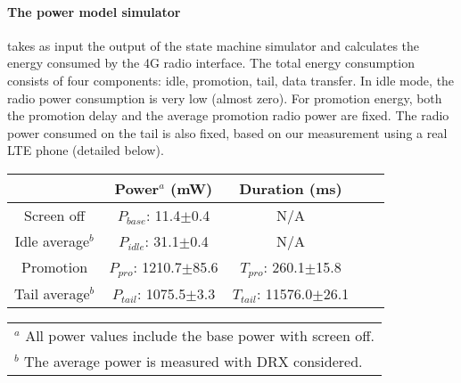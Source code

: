 \paragraph{The power model simulator} takes as input the output of the state machine simulator and calculates the energy consumed by the 4G radio interface. The total energy consumption consists of four components: idle, promotion, tail, data transfer. In idle mode, the radio power consumption is very low (almost zero). For promotion energy, both the promotion delay and the average promotion radio power are fixed. The radio power consumed on the tail is also fixed, based on our measurement using a real LTE phone (detailed below).


\begin{table}[t]
\begin{center}
\begin{tabular}{|c|c|c|c|c|}\hline
            & Power$^{a}$ (mW)        & Duration (ms) \\
\hline
Screen off       & $P_{base}$: 11.4$\pm$0.4      & N/A       \\
Idle average$^{b}$   & $P_{idle}$: 31.1$\pm$0.4      & N/A       \\
Promotion   & $P_{pro}$: 1210.7$\pm$85.6   & $T_{pro}$: 260.1$\pm$15.8 \\
Tail average$^{b}$        & $P_{tail}$: 1075.5$\pm$3.3    & $T_{tail}$: 11576.0$\pm$26.1 \\
\hline
\end{tabular}
\begin{tabular}{l}
\\{$^a$} All power values include the base power with screen off.
\\{$^b$} The average power is measured with DRX considered.
\end{tabular}
\label{tab:lte_para}
\end{center}
\end{table}

